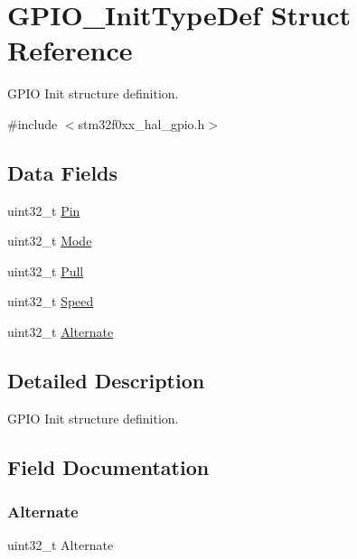 \hypertarget{struct_g_p_i_o___init_type_def}{}\section{G\+P\+I\+O\+\_\+\+Init\+Type\+Def Struct Reference}
\label{struct_g_p_i_o___init_type_def}


G\+P\+IO Init structure definition.  




{\ttfamily \#include $<$stm32f0xx\+\_\+hal\+\_\+gpio.\+h$>$}

\subsection*{Data Fields}
\begin{DoxyCompactItemize}
\item 
uint32\+\_\+t \hyperlink{struct_g_p_i_o___init_type_def_a871d0ab74071724e96b7cc9ae2a7532b}{Pin}
\item 
uint32\+\_\+t \hyperlink{struct_g_p_i_o___init_type_def_a0ffc93ec511ed9cf1663f6939bd3e839}{Mode}
\item 
uint32\+\_\+t \hyperlink{struct_g_p_i_o___init_type_def_a6cdde08eb507b710f8179a4326548e26}{Pull}
\item 
uint32\+\_\+t \hyperlink{struct_g_p_i_o___init_type_def_ad04b2041f59d32492ec36a891418f3fd}{Speed}
\item 
uint32\+\_\+t \hyperlink{struct_g_p_i_o___init_type_def_a9a352764836bb14ec56a94f77697b52d}{Alternate}
\end{DoxyCompactItemize}


\subsection{Detailed Description}
G\+P\+IO Init structure definition. 

\subsection{Field Documentation}
\mbox{\label{struct_g_p_i_o___init_type_def_a9a352764836bb14ec56a94f77697b52d}} 
\subsubsection{\texorpdfstring{Alternate}{Alternate}}
{\footnotesize\ttfamily uint32\+\_\+t Alternate}

